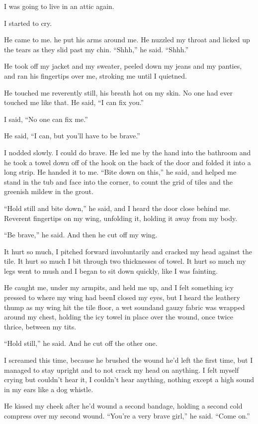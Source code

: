 I was going to live in an attic again.

I started to cry.

He came to me.  he put his arms around me.  He nuzzled my throat and
licked up the tears as they slid past my chin.  ``Shhh,'' he said. 
``Shhh.''

He took off my jacket and my sweater, peeled down my jeans and my
panties, and ran his fingertips over me, stroking me until I quietned.

He touched me reverently still, his breath hot on my skin.  No one had
ever touched me like that.  He said, ``I can fix you.''

I said, ``No one can fix me.''

He said, ``I can, but you'll have to be brave.''

I nodded slowly.  I could do brave.  He led me by the hand into the
bathroom and he took a towel down off of the hook on the back of the
door and folded it into a long strip.  He handed it to me.  ``Bite
down on this,'' he said, and helped me stand in the tub and face into
the corner, to count the grid of tiles and the greenish mildew in the
grout.

``Hold still and bite down,'' he said, and I heard the door close
behind me.  Reverent fingertips on my wing, unfolding it, holding it
away from my body.

``Be brave,'' he said.  And then he cut off my wing.

It hurt so much, I pitched forward involuntarily and cracked my head
against the tile.  It hurt so much I bit through two thicknesses of
towel.  It hurt so much my legs went to mush and I began to sit down
quickly, like I was fainting.

He caught me, under my armpits, and held me up, and I felt something
icy pressed to where my wing had been\dash{}I closed my eyes, but I heard
the leathery thump as my wing hit the tile floor, a wet sound\dash{}and
gauzy fabric was wrapped around my chest, holding the icy towel in
place over the wound, once twice thrice, between my tits.

``Hold still,'' he said.  And he cut off the other one.

I screamed this time, because he brushed the wound he'd left the first
time, but I managed to stay upright and to not crack my head on
anything.  I felt myself crying but couldn't hear it, I couldn't hear
anything, nothing except a high sound in my ears like a dog whistle.

He kissed my cheek after he'd wound a second bandage, holding a second
cold compress over my second wound.  ``You're a very brave girl,'' he
said.  ``Come on.''

